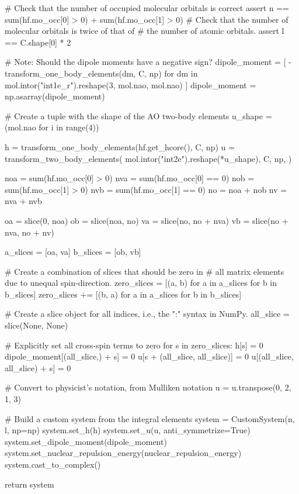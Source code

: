 \begin{python}
    # Check that the number of occupied molecular orbitals is correct
    assert n == sum(hf.mo_occ[0] > 0) + sum(hf.mo_occ[1] > 0)
    # Check that the number of molecular orbitals is twice of that of
    # the number of atomic orbitals.
    assert l == C.shape[0] * 2

    # Note: Should the dipole moments have a negative sign?
    dipole_moment = [
        -transform_one_body_elements(dm, C, np)
        for dm in mol.intor("int1e_r").reshape(3, mol.nao, mol.nao)
    ]
    dipole_moment = np.asarray(dipole_moment)

    # Create a tuple with the shape of the AO two-body elements
    u_shape = (mol.nao for i in range(4))

    h = transform_one_body_elements(hf.get_hcore(), C, np)
    u = transform_two_body_elements(
        mol.intor("int2e").reshape(*u_shape),
        C,
        np,
    )

    noa = sum(hf.mo_occ[0] > 0)
    nva = sum(hf.mo_occ[0] == 0)
    nob = sum(hf.mo_occ[1] > 0)
    nvb = sum(hf.mo_occ[1] == 0)
    no = noa + nob
    nv = nva + nvb

    oa = slice(0, noa)
    ob = slice(noa, no)
    va = slice(no, no + nva)
    vb = slice(no + nva, no + nv)

    a_slices = [oa, va]
    b_slices = [ob, vb]

    # Create a combination of slices that should be zero in
    # all matrix elements due to unequal spin-direction.
    zero_slices = [(a, b) for a in a_slices for b in b_slices]
    zero_slices += [(b, a) for a in a_slices for b in b_slices]

    # Create a slice object for all indices, i.e., the ":" syntax in NumPy.
    all_slice = slice(None, None)

    # Explicitly set all cross-spin terms to zero
    for s in zero_slices:
        h[s] = 0
        dipole_moment[(all_slice,) + s] = 0
        u[s + (all_slice, all_slice)] = 0
        u[(all_slice, all_slice) + s] = 0

    # Convert to physicist's notation, from Mulliken notation
    u = u.transpose(0, 2, 1, 3)

    # Build a custom system from the integral elements
    system = CustomSystem(n, l, np=np)
    system.set_h(h)
    system.set_u(u, anti_symmetrize=True)
    system.set_dipole_moment(dipole_moment)
    system.set_nuclear_repulsion_energy(nuclear_repulsion_energy)
    system.cast_to_complex()

    return system
\end{python}